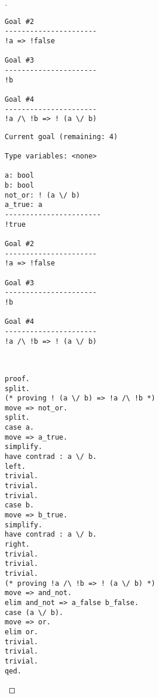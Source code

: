 \begin{enumerate}
\begin{proof}[\sol]
\begin{center}
\begin{minipage}[t]{.3\textwidth}
\begin{lstlisting}[style=normal]
Goal #2
----------------------
!a => !false

Goal #3
----------------------
!b

Goal #4
----------------------
!a /\ !b => ! (a \/ b)
\end{lstlisting}
\end{minipage}\hfill
\begin{minipage}[t]{.3\textwidth}
\centering{}
\begin{lstlisting}[style=normal]
Current goal (remaining: 4)

Type variables: <none>

a: bool
b: bool
not_or: ! (a \/ b)
a_true: a
-----------------------
!true

Goal #2
----------------------
!a => !false

Goal #3
----------------------
!b

Goal #4
----------------------
!a /\ !b => ! (a \/ b)
\end{lstlisting}
\end{minipage}
\end{center}


\ \color{gray!20}
\begin{lstlisting}[style=normal]
proof.
split.
(* proving ! (a \/ b) => !a /\ !b *)
move => not_or.
split.
case a.
move => a_true.
simplify.
have contrad : a \/ b.
left.
trivial.
trivial.
trivial.
case b.
move => b_true.
simplify.
have contrad : a \/ b.
right.
trivial.
trivial.
trivial.
(* proving !a /\ !b => ! (a \/ b) *)
move => and_not.
elim and_not => a_false b_false.
case (a \/ b).
move => or.
elim or.
trivial.
trivial.
trivial.
qed.
\end{lstlisting}
\end{proof}
\end{enumerate}

